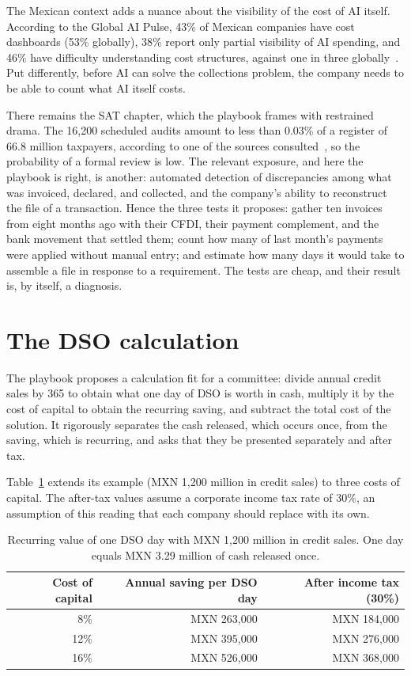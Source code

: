 \documentclass[11pt,a4paper]{article}
\begin{document}
The Mexican context adds a nuance about the visibility of the cost of AI itself. According to the Global AI Pulse, 43\% of Mexican companies have cost dashboards (53\% globally), 38\% report only partial visibility of AI spending, and 46\% have difficulty understanding cost structures, against one in three globally~\cite{kpmgpulse}. Put differently, before AI can solve the collections problem, the company needs to be able to count what AI itself costs.

There remains the SAT chapter, which the playbook frames with restrained drama. The 16,200 scheduled audits amount to less than 0.03\% of a register of 66.8 million taxpayers, according to one of the sources consulted~\cite{sad}, so the probability of a formal review is low. The relevant exposure, and here the playbook is right, is another: automated detection of discrepancies among what was invoiced, declared, and collected, and the company's ability to reconstruct the file of a transaction. Hence the three tests it proposes: gather ten invoices from eight months ago with their CFDI, their payment complement, and the bank movement that settled them; count how many of last month's payments were applied without manual entry; and estimate how many days it would take to assemble a file in response to a requirement. The tests are cheap, and their result is, by itself, a diagnosis.

\section{The DSO calculation}

The playbook proposes a calculation fit for a committee: divide annual credit sales by 365 to obtain what one day of DSO is worth in cash, multiply it by the cost of capital to obtain the recurring saving, and subtract the total cost of the solution. It rigorously separates the cash released, which occurs once, from the saving, which is recurring, and asks that they be presented separately and after tax.

Table~\ref{tab:dso} extends its example (MXN 1,200 million in credit sales) to three costs of capital. The after-tax values assume a corporate income tax rate of 30\%, an assumption of this reading that each company should replace with its own.

\begin{table}[h]
\centering
\small
\begin{tabular}{@{}rrr@{}}
\toprule
Cost of capital & Annual saving per DSO day & After income tax (30\%) \\
\midrule
8\% & MXN 263,000 & MXN 184,000 \\
12\% & MXN 395,000 & MXN 276,000 \\
16\% & MXN 526,000 & MXN 368,000 \\
\bottomrule
\end{tabular}
\caption{Recurring value of one DSO day with MXN 1,200 million in credit sales. One day equals MXN 3.29 million of cash released once.}
\label{tab:dso}
\end{table}
\end{document}
